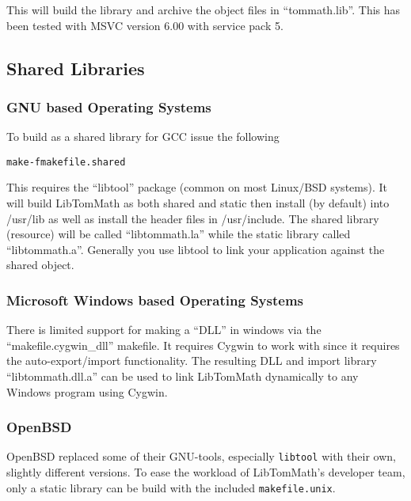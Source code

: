 \documentclass[synpaper]{book}
\begin{document}
This will build the library and archive the object files in ``tommath.lib''.  This has been tested with MSVC
version 6.00 with service pack 5.

\subsection{Shared Libraries}
\subsubsection{GNU based Operating Systems}
To build as a shared library for GCC issue the following
\begin{alltt}
make -f makefile.shared
\end{alltt}
This requires the ``libtool'' package (common on most Linux/BSD systems).  It will build LibTomMath as both shared
and static then install (by default) into /usr/lib as well as install the header files in /usr/include.  The shared
library (resource) will be called ``libtommath.la'' while the static library called ``libtommath.a''.  Generally
you use libtool to link your application against the shared object.
\subsubsection{Microsoft Windows based Operating Systems}
There is limited support for making a ``DLL'' in windows via the ``makefile.cygwin\_dll'' makefile.  It requires
Cygwin to work with since it requires the auto-export/import functionality.  The resulting DLL and import library
``libtommath.dll.a'' can be used to link LibTomMath dynamically to any Windows program using Cygwin.
\subsubsection{OpenBSD}
OpenBSD replaced some of their GNU-tools, especially \texttt{libtool} with their own, slightly different versions. To ease the workload of LibTomMath's developer team, only a static library can be build with the included \texttt{makefile.unix}.
\end{document}
